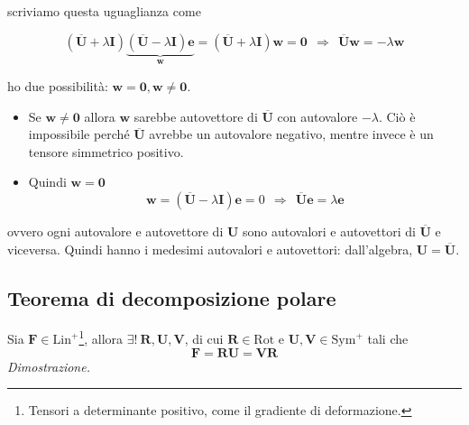 \documentclass[10pt,a4paper,twoside]{book}
\begin{document}
\begin{itemize}
scriviamo questa uguaglianza come

\begin{equation*}
(\overline{\mathbf{U}} +\lambda \mathbf{I})\underbrace{(\overline{\mathbf{U}} -\lambda \mathbf{I})\mathbf{e}}_{\mathbf{w}} =(\overline{\mathbf{U}} +\lambda \mathbf{I})\mathbf{w} =\mathbf{0} \ \ \Rightarrow \ \ \overline{\mathbf{U}}\mathbf{w} =-\lambda \mathbf{w}
\end{equation*}

ho due possibilità: $\mathbf{w} =\mathbf{0} ,\mathbf{w} \neq \mathbf{0}$.
\begin{itemize}
\item Se $\mathbf{w} \neq \mathbf{0}$ allora $\mathbf{w}$ sarebbe autovettore di $\overline{\mathbf{U}}$ con autovalore $-\lambda $. Ciò è impossibile perché $\overline{\mathbf{U}}$ avrebbe un autovalore negativo, mentre invece è un tensore simmetrico positivo.
\item Quindi $\mathbf{w} =\mathbf{0}$\begin{equation*}
\mathbf{w} =(\overline{\mathbf{U}} -\lambda \mathbf{I})\mathbf{e} =0\ \ \Rightarrow \ \ \overline{\mathbf{U}}\mathbf{e} =\lambda \mathbf{e}
\end{equation*}
\end{itemize}

ovvero ogni autovalore e autovettore di $\mathbf{U}$ sono autovalori e autovettori di $\overline{\mathbf{U}}$ e viceversa. Quindi hanno i medesimi autovalori e autovettori: dall'algebra, $\mathbf{U} =\overline{\mathbf{U}}$.
\end{itemize}
\subsection{Teorema di decomposizione polare}

Sia $\mathbf{F} \in \mathrm{Lin}^{+}$\footnote{Tensori a determinante positivo, come il gradiente di deformazione.}, allora $\exists !\ \mathbf{R} ,\mathbf{U} ,\mathbf{V}$, di cui $\mathbf{R} \in \mathrm{Rot}$ e $\mathbf{U} ,\mathbf{V} \in \mathrm{Sym}^{+}$ tali che
\begin{equation*}
\boxed{\mathbf{F} =\mathbf{RU} =\mathbf{VR}}
\end{equation*}
\textit{Dimostrazione.}
\end{document}
